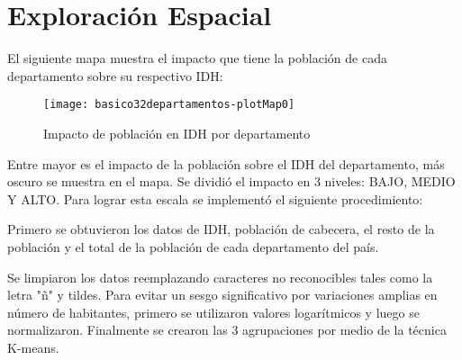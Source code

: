 

%



\section{Exploración Espacial}

El siguiente mapa muestra el impacto que tiene la población de cada departamento sobre su respectivo IDH:








 
 
\begin{figure}[h]
\centering
\begin{adjustbox}{width=8cm,height=6cm,clip,trim=1.5cm 2cm 0cm 2.5cm}
\texttt{[image: basico32departamentos-plotMap0]}
\end{adjustbox}
\caption{Impacto de población en IDH por departamento}\label{rawmap}
\end{figure}

Entre mayor es el impacto de la población sobre el IDH del departamento, más oscuro se muestra en el mapa. Se dividió el impacto en 3 niveles: BAJO, MEDIO Y ALTO.
Para lograr esta escala se implementó el siguiente procedimiento:

Primero se obtuvieron los datos de IDH, población de cabecera, el resto de la población y el total de la población de cada departamento del país.

Se limpiaron los datos reemplazando caracteres no reconocibles tales como la letra "ñ" y tildes.
Para evitar un sesgo significativo por variaciones amplias en número de habitantes, primero se utilizaron valores logarítmicos y luego se normalizaron. Finalmente se crearon las 3 agrupaciones por medio de la técnica K-means.


\endinput


%
